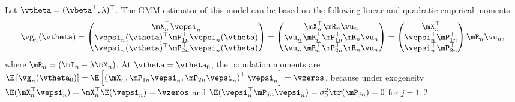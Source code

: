 \documentclass[english,12pt]{book}\usepackage[]{graphicx}\usepackage[]{xcolor}
\begin{document}
Let $\vtheta = (\vbeta^\top,\lambda)^\top$. The GMM estimator of this model can be based on the following linear and quadratic empirical moments
\begin{equation*}
 \vg_n(\vtheta) = \begin{pmatrix}
                    \mX_n^\top
                    \vepsi_n \\
                    \vepsi_n(\vtheta)^\top\mP_{1n}^\top\vepsi_n(\vtheta) \\
                    \vepsi_n(\vtheta)^\top\mP_{2n}^\top\vepsi_n(\vtheta)
                  \end{pmatrix}
                  =
                  \begin{pmatrix}
                   \mX_n^\top\mR_n\vu_n  \\
                    \vu_n^\top\mR_n^\top \mP_{1n}^\top\mR_n\vu_n \\
                    \vu_n^\top\mR_n^\top \mP_{2n}^\top\mR_n\vu_n
                  \end{pmatrix}
                  = \begin{pmatrix}
    \mX_n^\top \\
    \vepsi_n^\top\mP_{1n}^\top \\
    \vepsi_n^\top\mP_{2n}^\top
\end{pmatrix} 
\mR_n\vu_n, 
\end{equation*}
%
where $\mR_n = (\mI_n - \lambda \mM_n)$. At $\vtheta = \vtheta_0$, the population moments are $\E\left[\vg_n(\vtheta_0)\right] = \E\left[\left(\mX_n, \mP_{1n}\vepsi_n, \mP_{2n}\vepsi_n\right)^\top\vepsi_n\right] = \vzeros$, because under exogeneity $\E(\mX_n^\top\vepsi_n) = \mX_n^\top\E(\vepsi_n) = \vzeros$ and $\E(\vepsi_n^\top\mP_{jn}\vepsi_n) = \sigma_0^2\tr(\mP_{jn}) = 0$ for $j = 1, 2$. 
\end{document}
